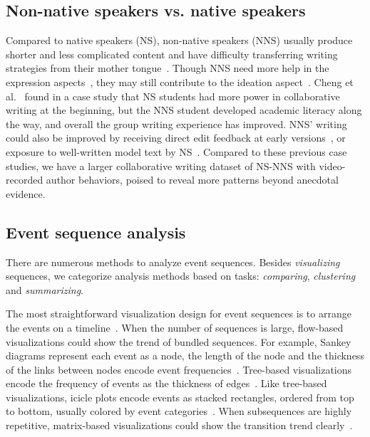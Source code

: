 \subsection{Non-native speakers vs. native speakers}
Compared to native speakers (NS), non-native speakers (NNS) usually produce shorter and less complicated content and have difficulty transferring writing strategies from their mother tongue~\cite{chenoweth2001fluency, wolfersberger2003l1, uzawa1989writing}. Though NNS need more help in the expression aspects~\cite{severino2009comparison}, they may still contribute to the ideation aspect~\cite{goffman1981forms}. Cheng et al.~\cite{cheng2013non} found in a case study that NS students had more power in collaborative writing at the beginning, but the NNS student developed academic literacy along the way, and overall the group writing experience has improved. NNS' writing could also be improved by receiving direct edit feedback at early versions~\cite{karim2020revision, yang2021supervisor}, or exposure to well-written model text by NS~\cite{kang2020using}. Compared to these previous case studies, we have a larger collaborative writing dataset of NS-NNS with video-recorded author behaviors, poised to reveal more patterns beyond anecdotal evidence.

\subsection{Event sequence analysis}
There are numerous methods to analyze event sequences. Besides \textit{visualizing} sequences, we categorize analysis methods based on tasks: \textit{comparing}, \textit{clustering} and \textit{summarizing}.

The most straightforward visualization design for event sequences is to arrange the events on a timeline~\cite{plaisant1996lifelines, krstajic2011cloudlines}. When the number of sequences is large, flow-based visualizations could show the trend of bundled sequences. For example, Sankey diagrams represent each event as a node, the length of the node and the thickness of the links between nodes encode event frequencies~\cite{wongsuphasawat2011outflow, perer2014frequence}. Tree-based visualizations encode the frequency of events as the thickness of edges~\cite{hu2016visualizing, liu2017coreflow}. Like tree-based visualizations, icicle plots encode events as stacked rectangles, ordered from top to bottom, usually colored by event categories~\cite{wongsuphasawat2011lifeflow, liu2016patterns}. When subsequences are highly repetitive, matrix-based visualizations could show the transition trend clearly~\cite{perer2012matrixflow, zhao2015matrixwave}.

